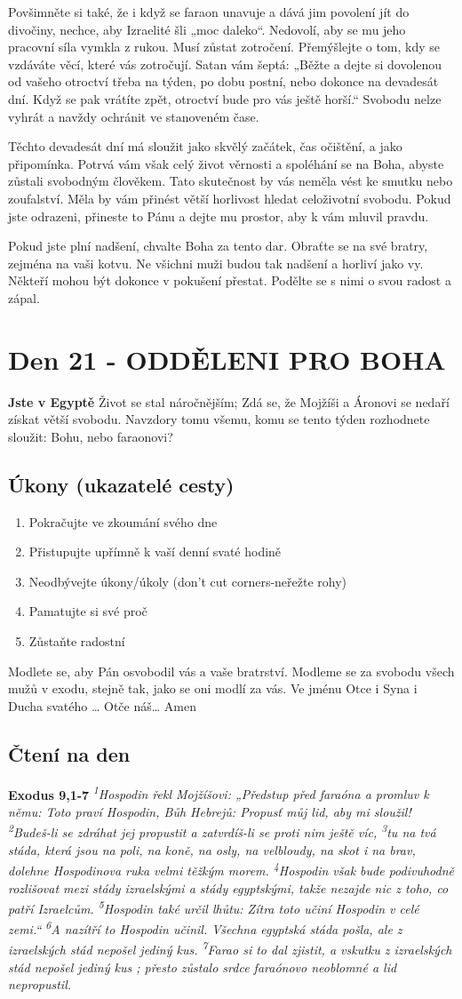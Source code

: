 \documentclass[11pt]{article}
\newcommand{\zacatekTretiTyden}{
  \textbf{Jste v Egyptě} \newline
  Život se stal náročnějším; Zdá se, že Mojžíši a Áronovi se nedaří získat větší svobodu. Navzdory tomu všemu,
komu se tento týden rozhodnete sloužit: Bohu, nebo faraonovi?

\subsection*{Úkony (ukazatelé cesty)}
\begin{enumerate}
  \item Pokračujte ve zkoumání svého dne
  \item Přistupujte upřímně k vaší denní svaté hodině
  \item Neodbývejte úkony/úkoly (don’t cut corners-neřežte rohy)
  \item Pamatujte si své proč
  \item Zůstaňte radostní
\end{enumerate}
Modlete se, aby Pán osvobodil vás a vaše bratrství. \newline
Modleme se za svobodu všech mužů v exodu, stejně tak, jako se oni modlí za vás.\newline
Ve jménu Otce i Syna i Ducha svatého …  Otče náš… Amen
}
\begin{document}
Povšimněte si také, že i když se faraon unavuje a dává jim povolení jít do divočiny, nechce, aby Izraelité
šli „moc daleko“. Nedovolí, aby se mu jeho pracovní síla vymkla z rukou. Musí zůstat zotročení.
Přemýšlejte o tom, kdy se vzdáváte věcí, které vás zotročují. Satan vám šeptá: „Běžte a dejte si dovolenou
od vašeho otroctví třeba na týden, po dobu postní, nebo dokonce na devadesát dní. Když se pak vrátíte
zpět, otroctví bude pro vás ještě horší.“ Svobodu nelze vyhrát a navždy ochránit ve stanoveném čase.

Těchto devadesát dní má sloužit jako skvělý začátek, čas očištění, a jako připomínka. Potrvá vám však
celý život věrnosti a spoléhání se na Boha, abyste zůstali svobodným člověkem.
Tato skutečnost by vás neměla vést ke smutku nebo zoufalství. Měla by vám přinést větší horlivost hledat
celoživotní svobodu. Pokud jste odrazeni, přineste to Pánu a dejte mu prostor, aby k vám mluvil pravdu.

Pokud jste plní nadšení, chvalte Boha za tento dar. Obraťte se na své bratry, zejména na vaši kotvu. Ne
všichni muži budou tak nadšení a horliví jako vy. Někteří mohou být dokonce v pokušení přestat. Podělte
se s nimi o svou radost a zápal.

\newpage
\section{Den 21 - ODDĚLENI PRO BOHA}
\zacatekTretiTyden
\subsection*{Čtení na den}
\textbf{Exodus 9,1-7}
\newline
\textit{
\textsuperscript{1}Hospodin řekl Mojžíšovi: „Předstup před faraóna a promluv k němu: Toto praví Hospodin, Bůh Hebrejů: Propusť můj lid, aby mi sloužil!
\textsuperscript{2}Budeš-li se zdráhat jej propustit a zatvrdíš-li se proti nim ještě víc,
\textsuperscript{3}tu na tvá stáda, která jsou na poli, na koně, na osly, na velbloudy, na skot i na brav, dolehne Hospodinova ruka velmi těžkým morem.
\textsuperscript{4}Hospodin však bude podivuhodně rozlišovat mezi stády izraelskými a stády egyptskými, takže nezajde nic z toho, co patří Izraelcům.
\textsuperscript{5}Hospodin také určil lhůtu: Zítra toto učiní Hospodin v celé zemi.“
\textsuperscript{6}A nazítří to Hospodin učinil. Všechna egyptská stáda pošla, ale z izraelských stád nepošel jediný kus. 
\textsuperscript{7}Farao si to dal zjistit, a vskutku z izraelských stád nepošel jediný kus ; přesto zůstalo srdce faraónovo neoblomné a lid nepropustil.
}
\end{document}
